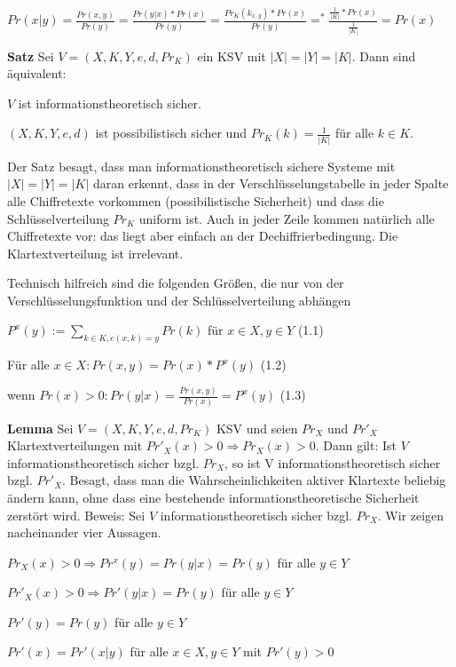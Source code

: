 \documentclass[a4paper]{article}
\begin{document}
\begin{multicols}{3}
$Pr(x|y) =\frac{Pr(x,y)}{Pr(y)}=\frac{Pr(y|x)*Pr(x)}{Pr(y)}=\frac{Pr_K(k_{x,y})*Pr(x)}{Pr(y)}=^* \frac{\frac{1}{|K|}*Pr(x)}{\frac{1}{|K|}}=Pr(x)$

    \textbf{Satz} Sei $V= (X,K,Y,e,d,Pr_K)$ ein KSV mit $|X|=|Y|=|K|$. Dann sind äquivalent:
    \begin{enumerate*}
        \item $V$ ist informationstheoretisch sicher.
        \item $(X,K,Y,e,d)$ ist possibilistisch sicher und $Pr_K(k)=\frac{1}{|K|}$ für alle $k\in K$.
    \end{enumerate*}

    Der Satz besagt, dass man informationstheoretisch sichere Systeme mit $|X|=|Y|=|K|$ daran erkennt, dass in der Verschlüsselungstabelle in jeder Spalte alle Chiffretexte vorkommen (possibilistische Sicherheit) und dass die Schlüsselverteilung $Pr_K$ uniform ist. Auch in jeder Zeile kommen natürlich alle Chiffretexte vor: das liegt aber einfach an der Dechiffrierbedingung. Die Klartextverteilung ist irrelevant. 

    Technisch hilfreich sind die folgenden Größen, die nur von der Verschlüsselungsfunktion und der Schlüsselverteilung abhängen
    \begin{itemize*}
        \item $P^x(y):=\sum_{k\in K, e(x,k)=y} Pr(k)$ für $x\in X,y\in Y$ (1.1)
        \item Für alle $x\in X:Pr(x,y) = Pr(x)*P^x(y)$ (1.2)
        \item wenn $Pr(x)> 0:Pr(y|x) = \frac{Pr(x,y)}{Pr(x)}=P^x(y)$ (1.3) 
    \end{itemize*}

    \textbf{Lemma} Sei $V=(X,K,Y,e,d,Pr_K)$ KSV und seien $Pr_X$ und $Pr'_X$ Klartextverteilungen mit $Pr'_X(x)>0\Rightarrow Pr_X(x)>0$. Dann gilt: Ist $V$ informationstheoretisch sicher bzgl. $Pr_X$, so ist V informationstheoretisch sicher bzgl. $Pr'_X$. Besagt, dass man die Wahrscheinlichkeiten aktiver Klartexte beliebig ändern kann, ohne dass eine bestehende informationstheoretische Sicherheit zerstört wird.
    Beweis: Sei $V$ informationstheoretisch sicher bzgl. $Pr_X$. Wir zeigen nacheinander vier Aussagen.
    \begin{enumerate*}
        \item $Pr_X(x)> 0 \Rightarrow Pr^x(y) = Pr(y|x) = Pr(y)$ für alle $y\in Y$
        \item $Pr'_X(x)> 0 \Rightarrow Pr'(y|x) = Pr(y)$ für alle $y\in Y$
        \item $Pr'(y)=Pr(y)$ für alle $y\in Y$
        \item $Pr'(x)=Pr'(x|y)$ für alle $x\in X,y\in Y$ mit $Pr'(y)>0$
    \end{enumerate*}


\end{multicols}
\end{document}
